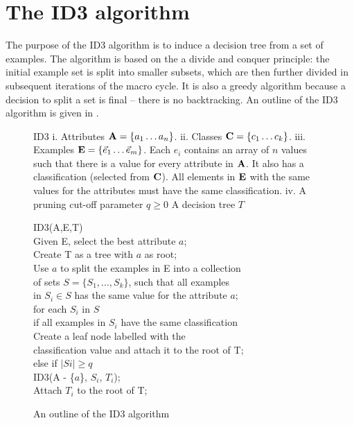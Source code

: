 
\section{The ID3 algorithm}
\label{sec:id3}
The purpose of the ID3 algorithm \cite{quinlan:trees} is to induce a decision tree from a set of examples.  The algorithm is based on the a divide and conquer principle: the initial example set is split into smaller subsets, which are then further divided in subsequent iterations of the macro cycle. It is also a greedy algorithm because a decision to split a set is final -- there is no backtracking.  An outline of the ID3 algorithm is given in .
\begin{figure}[!ht]
\begin{algorithm}
{ID3}
{ i. Attributes ${\bf A} = \{ a_1 \ldots a_n\}$. \newline
	ii. Classes ${\bf C} = \{ c_1 \ldots c_k\}$. \newline
  iii. Examples ${\bf E} = \{\vec e_1 \ldots \vec e_m\}$. Each $e_i$ contains an array of $n$ values such that there is a value for every attribute in ${\bf A}$.  It also has a classification (selected from ${\bf C}$). All elements in ${\bf E}$ with the same values for the attributes must have the same classification.\newline
	iv. A pruning cut-off parameter $q \geq 0$
	}
{A decision tree $T$} 

ID3(A,E,T) \+\\
Given E, select the best attribute $a$; \label{line:id3_select} \\
Create T as a tree with $a$ as root; \\
Use $a$ to split the examples in E  into a collection  \+ \\
	of sets $S = \{S_1, \ldots, S_k\}$, such that all examples \\
	 in $S_i \in S$ has the same value for the attribute $a$; \- \\ 
for each $S_i$ in $S$ \+ \\
	if all examples in $S_i$ have the same classification \+ \\
			Create a leaf node labelled with the  \+ \\ 
			classification value and attach it
			to the root of T; \- \-\\ 
	else  if $|Si| \geq q$ \label{line:id3_prune}\+ \\ 
			ID3(A - \{$a$\}, $S_i$, $T_i$); \\
			Attach $T_i$ to the root of T;
\end{algorithm}
\caption{An outline of the ID3 algorithm}
\label{alg:id3}	
\end{figure}

